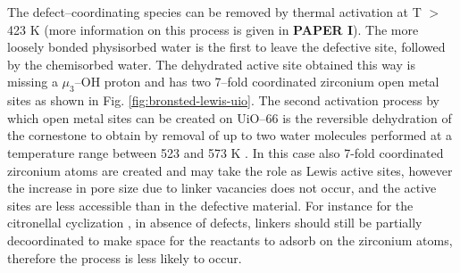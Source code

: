 \npar
The defect--coordinating species can be removed by thermal activation at T $>$423 K (more information on this process is given in \textbf{PAPER I}). The more loosely bonded physisorbed water is the first to leave the defective site, followed by the chemisorbed water. The dehydrated active site obtained this way is missing a $\mu_{3}$--OH proton and has two 7--fold coordinated zirconium open metal sites as shown in Fig. \ref{fig:bronsted-lewis-uio}. 
\npar
The second activation process by which open metal sites can be created on UiO--66 is the reversible dehydration of the  cornestone to obtain  by removal of up to two water molecules performed at a temperature range between 523 and 573 K \cite{valenzano2011disclosing}. In this case also 7-fold coordinated zirconium atoms are created and may take the role as Lewis active sites, however the increase in pore size due to linker vacancies does not occur, and the active sites are less accessible than in the defective material. For instance for the citronellal cyclization \cite{vermoortele2012electronic}, in absence of defects, linkers should still be partially decoordinated to make space for the reactants to adsorb on the zirconium atoms, therefore the process is less likely to occur.


